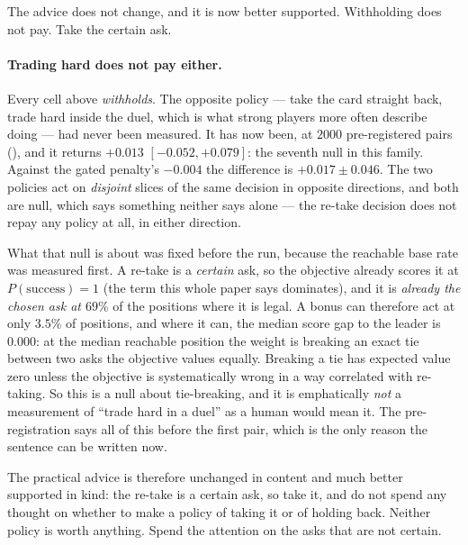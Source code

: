 \documentclass[11pt,letterpaper]{article}
\begin{document}
The advice does not change, and it is now better supported. Withholding does
not pay. Take the certain ask.

\paragraph{Trading hard does not pay either.} Every cell above
\emph{withholds}. The opposite policy --- take the card straight back, trade
hard inside the duel, which is what strong players more often describe doing
--- had never been measured. It has now been, at $2000$ pre-registered pairs
(), and it returns
$\mathbf{+0.013}$ $[-0.052, +0.079]$: the seventh null in this family. Against
the gated penalty's $-0.004$ the difference is $+0.017 \pm 0.046$. The two
policies act on \emph{disjoint} slices of the same decision in opposite
directions, and both are null, which says something neither says alone --- the
re-take decision does not repay any policy at all, in either direction.

What that null is about was fixed before the run, because the reachable base
rate was measured first. A re-take is a \emph{certain} ask, so the objective
already scores it at $P(\text{success}) = 1$ (the term this whole paper says
dominates), and it is \emph{already the chosen ask at $69\%$} of the positions
where it is legal. A bonus can therefore act at only $3.5\%$ of positions, and
where it can, the median score gap to the leader is $\mathbf{0.000}$: at the
median reachable position the weight is breaking an exact tie between two asks
the objective values equally. Breaking a tie has expected value zero unless the
objective is systematically wrong in a way correlated with re-taking. So this is
a null about tie-breaking, and it is emphatically \emph{not} a measurement of
``trade hard in a duel'' as a human would mean it. The pre-registration says all
of this before the first pair, which is the only reason the sentence can be
written now.

The practical advice is therefore unchanged in content and much better
supported in kind: the re-take is a certain ask, so take it, and do not spend
any thought on whether to make a policy of taking it or of holding back.
Neither policy is worth anything. Spend the attention on the asks that are not
certain.
\end{document}
